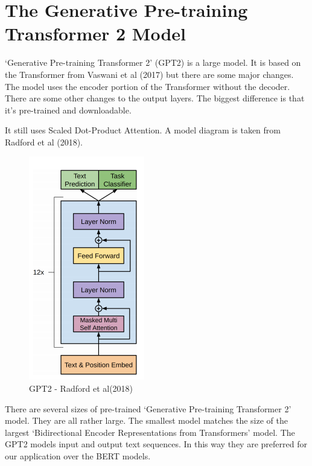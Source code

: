 \section{The Generative Pre-training Transformer 2 Model}

`Generative Pre-training Transformer 2' (\ac{GPT2}) is a large model. It is based on the Transformer from Vaswani et al (2017)\cite{Vaswani2017AttentionIA} but there are some major changes. The model uses the encoder portion of the Transformer without the decoder. There are some other changes to the output layers. The biggest difference is that it's pre-trained and downloadable.

It still uses Scaled Dot-Product Attention. A model diagram is taken from Radford et al (2018)\cite{radford2018improving}.

\begin{figure}[H]
	\begin{center}
		
		
		\includegraphics[scale=4.0]{diagram-mat05}
	\end{center}
	\caption[Generative Pre-training Transformer 2 ]{GPT2 - Radford et al(2018)\cite{radford2018improving}}
	
\end{figure}

There are several sizes of pre-trained `Generative Pre-training Transformer 2' model. They are all rather large. The smallest model matches the size of the largest `Bidirectional Encoder Representations from Transformers' model. The GPT2 models input and output text sequences. In this way they are preferred for our application over the BERT models. 


